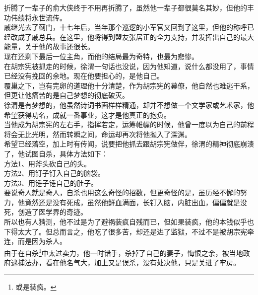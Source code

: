 \begin{multicols}{\theparacolNo}
折腾了一辈子的俞大侠终于不用再折腾了，虽然他一辈子都很莫名其妙，但他的丰功伟绩将永世流传。\\

戚继光去了蓟门，十七年后，当年那个巡逻的小军官又回到了这里，但他的称呼已经改成了戚总兵。在这里，他将得到盟友张居正的全力支持，并发挥出自己的最大能量，关于他的故事还很长。\\

现在还剩下最后一位主角，而他的结局最为奇特，也最为悲惨。\\

在胡宗宪被抓走的时候，徐渭一句话也没说，因为他知道，说什么都没用了，事情已经没有挽回的余地。现在他要担心的，是他自己。\\

覆巢之下，岂有完卵的道理他十分清楚，作为胡宗宪的幕僚，他自然也难逃干系，但更让他痛苦的是自己梦想的彻底破灭。\\

徐渭是有梦想的，他虽然诗词书画样样精通，却并不想做一个文学家或艺术家，他希望获得功名，成就一番事业，这才是他真正的抱负。\\

当他成为胡宗宪的左右手，指挥若定，运筹帷幄的时候，他曾一度以为自己的前程将会无比光明，然而转瞬之间，命运却再次将他抛入了深渊。\\

希望已经落空，加上时有传闻，说要把他抓去跟胡宗宪做伴，徐渭的精神彻底崩溃了，他试图自杀，具体方法如下：\\

方法1、用斧头砍自己的头。\\

方法2、用钉子钉入自己的脑袋。\\

方法3、用锤子锤自己的肚子。\\

要说奇人就是奇人，自杀也用这么奇怪的招数，但更奇怪的是，虽历经不懈的努力，他竟然还是没有死成，虽然他鲜血满面，长钉入脑，内脏出血，偏偏就是没死，创造了医学界的奇迹。\\

所以也有人猜测，他不过是为了避祸装疯自残而已，但如果装疯，他的本钱似乎也下得太大了。但总而言之，他吃了很多苦，却还是进了监狱，不过不是被胡宗宪牵连，而是因为杀人。\\

由于在自杀\footnote{或是装疯。}中太过卖力，他一时错手，杀掉了自己的妻子，悔恨之余，被当地政府逮捕法办，看在他名气大，加上又是误杀，没有处决他，只是关进了牢房。\\


\end{multicols}
